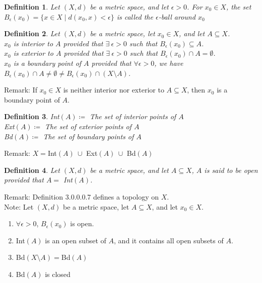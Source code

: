 \documentclass[11pt,oneside]{book}
\theoremstyle{break}
\theoremstyle{break}
\newtheorem{defn}{Definition}[corL]
\newcommand{\note}{\color{red}Note: \color{black}}
\newcommand{\remark}{\color{blue}Remark: \color{black}}
\begin{document}
\begin{defn}
Let $(X,d)$ be a metric space, and let $\epsilon>0$. For $x_0\in X$, the set $B_\epsilon(x_0) = \{x \in X\mid d(x_0,x)<\epsilon\}$ is called the $\epsilon$-ball around $x_0$
\end{defn}

\begin{defn}
Let $(X,d)$ be a metric space, let $x_0 \in X$, and let $A \subseteq X$.\\ $x_0$ is interior to $A$ provided that $\exists\ \epsilon>0$ such that $B_\epsilon(x_0) \subseteq A$.\\ $x_0$ is exterior to $A$ provided that $\exists\ \epsilon>0$ such that $B_\epsilon(x_0) \cap A = \emptyset$.\\
$x_0$ is a boundary point of $A$ provided that $\forall \epsilon>0$, we have $B_\epsilon(x_0)\cap A\neq \emptyset \neq B_\epsilon(x_0)\cap (X\setminus A)$.
\end{defn}
\remark If $x_0\in X$ is neither interior nor exterior to $A\subseteq X$, then $x_0$ is a boundary point of $A$. 

\begin{defn}
Int$(A) \coloneqq $ The set of interior points of $A$\\
Ext$(A) \coloneqq $ The set of exterior points of $A$\\
Bd$(A) \coloneqq $ The set of boundary points of $A$
\end{defn}

\remark $X =$Int$(A)\ \cup $ Ext$(A)\ \cup $ Bd$(A)$

\begin{defn}
Let $(X,d)$ be a metric space, and let $A \subseteq X$, $A$ is said to be open provided that $A =$ Int$(A)$.
\end{defn}
\remark Definition 3.0.0.0.7 defines a topology on $X$.\\

\note Let $(X,d)$ be a metric space, let $A \subseteq X$, and let $x_0 \in X$.
\begin{enumerate}[topsep=3pt,itemsep=-1ex,partopsep=1ex,parsep=1ex]
\item $\forall \epsilon>0$, $B_\epsilon(x_0)$ is open.
\item Int$(A)$ is an open subset of $A$, and it contains all open subsets of $A$.
\item Bd$(X\setminus A) =$Bd$(A)$
\item Bd$(A)$ is closed
\end{enumerate}
\end{document}
